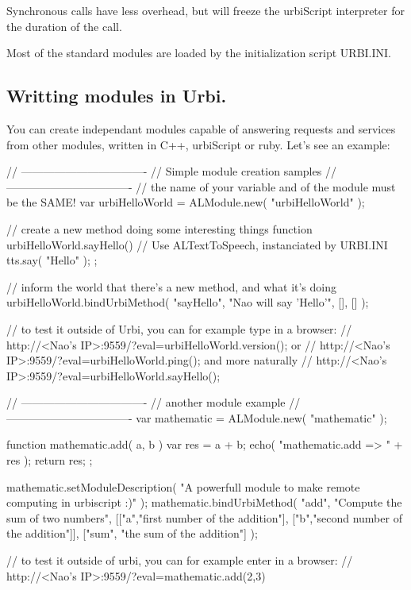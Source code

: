 Synchronous calls have less overhead, but will freeze the urbiScript
interpreter for the duration of the call.

Most of the standard modules are loaded by the initialization script URBI.INI.

\subsection{Writting \naoqi modules in Urbi.}

You can create independant modules capable of answering requests and services
from other \naoqi modules, written in C++, urbiScript or ruby. Let's see an
example:

\begin{urbifixme}

// ----------------------------------
// Simple module creation samples
// ----------------------------------
// the name of your variable and of the module must be the SAME!
var urbiHelloWorld = ALModule.new( "urbiHelloWorld" );

// create a new method doing some interesting things
function urbiHelloWorld.sayHello()
{
  // Use ALTextToSpeech, instanciated by URBI.INI
  tts.say( "Hello" );
};

// inform the world that there's a new method, and what it's doing
urbiHelloWorld.bindUrbiMethod( "sayHello", "Nao will say 'Hello'", [], [] );

// to test it outside of Urbi, you can for example type in a browser:
// http://<Nao's IP>:9559/?eval=urbiHelloWorld.version(); or
// http://<Nao's IP>:9559/?eval=urbiHelloWorld.ping(); and more naturally
// http://<Nao's IP>:9559/?eval=urbiHelloWorld.sayHello();

// ----------------------------------
// another module example
// ----------------------------------
var mathematic = ALModule.new( "mathematic" );

function mathematic.add( a, b )
{
  var res = a + b;
  echo( "mathematic.add => " + res );
  return res;
};

mathematic.setModuleDescription(
  "A powerfull module to make remote computing in urbiscript :)" );
mathematic.bindUrbiMethod( "add", "Compute the sum of two numbers",
[["a","first number of the addition"],
["b","second number of the addition"]],
["sum", "the sum of the addition"] );

// to test it outside of urbi, you can for example enter in a browser:
// http://<Nao's IP>:9559/?eval=mathematic.add(2,3)
\end{urbifixme}

